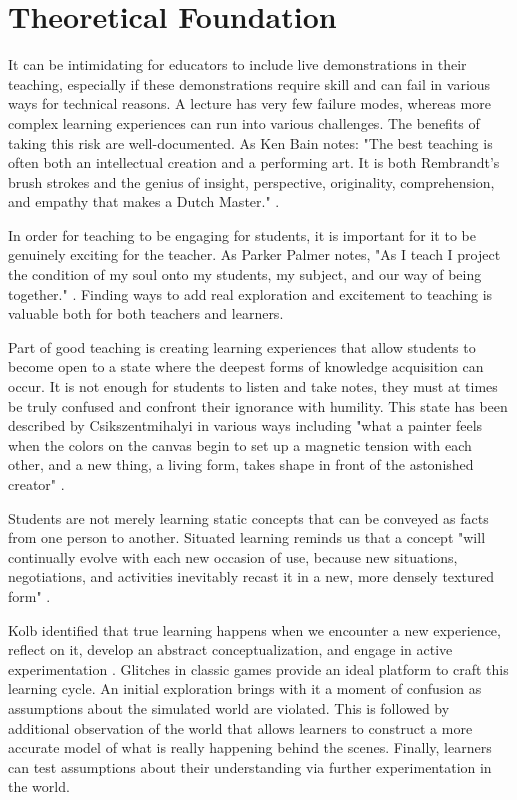 \documentclass[letterpaper]{article}
\begin{document}
\section{Theoretical Foundation}
It can be intimidating for educators to include live demonstrations in their teaching, especially if these demonstrations require skill and can fail in various ways for technical reasons. A lecture has very few failure modes, whereas more complex learning experiences can run into various challenges. The benefits of taking this risk are well-documented. As Ken Bain notes: "The best teaching is often both an intellectual creation and a performing art. It is both Rembrandt’s brush strokes and the genius of insight, perspective, originality, comprehension, and empathy that makes a Dutch Master." \cite{bain2004best}.

In order for teaching to be engaging for students, it is important for it to be genuinely exciting for the teacher. As Parker Palmer notes, "As I teach I project the condition of my soul onto my students, my subject, and our way of being together." \cite{palmer2000courage}. Finding ways to add real exploration and excitement to teaching is valuable both for both teachers and learners.

Part of good teaching is creating learning experiences that allow students to become open to a state where the deepest forms of knowledge acquisition can occur. It is not enough for students to listen and take notes, they must at times be truly confused and confront their ignorance with humility. This state has been described by Csikszentmihalyi in various ways including  "what a painter feels when the colors on the canvas begin to set up a magnetic tension with each other, and a new thing, a living form, takes shape in front of the astonished creator" \cite{csikszentmihalyi1990flow}.

Students are not merely learning static concepts that can be conveyed as facts from one person to another. Situated learning reminds us that a concept "will continually evolve with each new occasion of use, because new situations, negotiations, and activities inevitably recast it in a new, more densely textured form" \cite{brown1989situated}.

Kolb identified that true learning happens when we encounter a new experience, reflect on it, develop an abstract conceptualization, and engage in active experimentation \cite{kolb84}. Glitches in classic games provide an ideal platform to craft this learning cycle. An initial exploration brings with it a moment of confusion as assumptions about the simulated world are violated. This is followed by additional observation of the world that allows learners to construct a more accurate model of what is really happening behind the scenes. Finally, learners can test assumptions about their understanding via further experimentation in the world.
\end{document}
